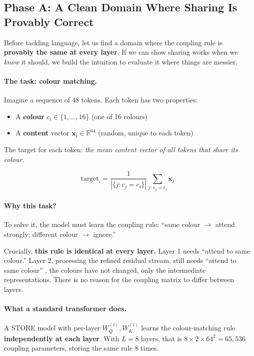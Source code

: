 \documentclass[11pt, a4paper]{article}
\newcommand{\x}{\mathbf{x}}
\newcommand{\R}{\mathbb{R}}
\theoremstyle{remark}
\begin{document}
\subsection{Phase A: A Clean Domain Where Sharing Is Provably Correct}
\label{sec:grn:phase-a}

Before tackling language, let us find a domain where the coupling rule is \textbf{provably the same at every layer}.
If we can show sharing works when we \emph{know} it should, we build the intuition to evaluate it where things are messier.

\paragraph{The task: colour matching.}
Imagine a sequence of 48 tokens.
Each token has two properties:
\begin{itemize}[nosep]
    \item A \textbf{colour} $c_i \in \{1, \ldots, 16\}$ (one of 16 colours)
    \item A \textbf{content} vector $\x_i \in \R^{64}$ (random, unique to each token)
\end{itemize}
The target for each token: \emph{the mean content vector of all tokens that share its colour.}

\[
    \text{target}_i = \frac{1}{|\{j : c_j = c_i\}|} \sum_{j:\, c_j = c_i} \x_j
\]

\paragraph{Why this task?}
To solve it, the model must learn the coupling rule: ``same colour $\to$ attend strongly; different colour $\to$ ignore.''

Crucially, \textbf{this rule is identical at every layer.}
Layer 1 needs ``attend to same colour.''
Layer 2, processing the refined residual stream, still needs ``attend to same colour'' , 
the colours have not changed, only the intermediate representations.
There is no reason for the coupling matrix to differ between layers.

\paragraph{What a standard transformer does.}
A STORE model with per-layer $W_Q^{(l)}, W_K^{(l)}$ learns the colour-matching rule \textbf{independently at each layer}.
With $L = 8$ layers, that is $8 \times 2 \times 64^2 = 65{,}536$ coupling parameters, storing the same rule 8 times.
\end{document}
